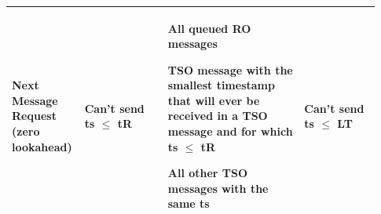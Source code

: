 \begin{compactstdpage}
\begin{center}
{\begin{tabular}{|>{\raggedright\arraybackslash}p{0.15\linewidth}|>{\raggedright\arraybackslash}p{0.22\linewidth}|>{\raggedright\arraybackslash}p{0.36\linewidth}|>{\raggedright\arraybackslash}p{0.20\linewidth}|}
            Next Message Request (zero lookahead) & Can't send ts $\leq$ tR                                                                                                                                                                  & All queued RO messages\par TSO message with the smallest timestamp that will ever be received in a TSO message and for which ts $\leq$ tR\par All other TSO messages with the same ts & Can't send ts $\leq$ LT \\ \hline
        \end{tabular}}
    \end{center}


\end{compactstdpage}

\clearpage

